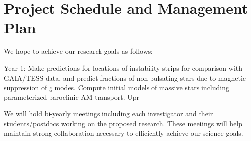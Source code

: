 \section{Project Schedule and Management Plan}

We hope to achieve our research goals as follows:

Year 1: Make predictions for locations of instability strips for comparison with GAIA/TESS data, and predict fractions of non-pulsating stars due to magnetic suppression of g modes. Compute initial models of massive stars including parameterized baroclinic AM transport.  Upr

We will  hold bi-yearly meetings including each investigator and their students/postdocs working on the proposed research. These meetings will help maintain strong collaboration necessary to efficiently achieve our science goals.
